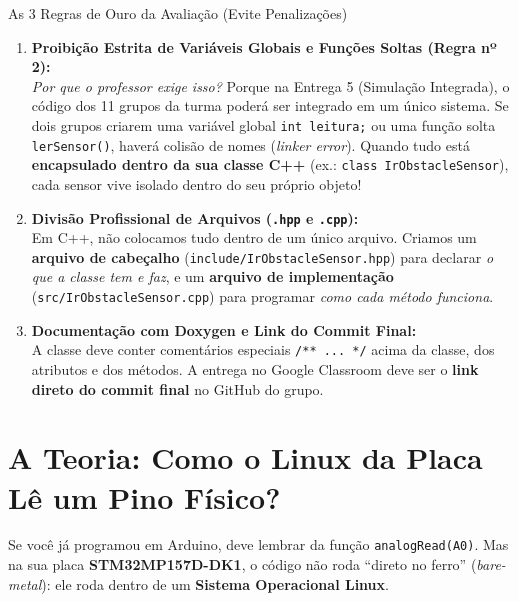 \documentclass[11pt,a4paper]{article}
\begin{document}
\begin{alertbox}{As 3 Regras de Ouro da Avaliação (Evite Penalizações)}
\begin{enumerate}[leftmargin=*]
    \item \textbf{Proibição Estrita de Variáveis Globais e Funções Soltas (Regra nº 2):} \\
    \textit{Por que o professor exige isso?} Porque na Entrega 5 (Simulação Integrada), o código dos 11 grupos da turma poderá ser integrado em um único sistema. Se dois grupos criarem uma variável global \texttt{int leitura;} ou uma função solta \texttt{lerSensor()}, haverá colisão de nomes (\textit{linker error}). Quando tudo está \textbf{encapsulado dentro da sua classe C++} (ex.: \texttt{class IrObstacleSensor}), cada sensor vive isolado dentro do seu próprio objeto!
    
    \item \textbf{Divisão Profissional de Arquivos (\texttt{.hpp} e \texttt{.cpp}):} \\
    Em C++, não colocamos tudo dentro de um único arquivo. Criamos um \textbf{arquivo de cabeçalho} (\texttt{include/IrObstacleSensor.hpp}) para declarar \textit{o que a classe tem e faz}, e um \textbf{arquivo de implementação} (\texttt{src/IrObstacleSensor.cpp}) para programar \textit{como cada método funciona}.
    
    \item \textbf{Documentação com Doxygen e Link do Commit Final:} \\
    A classe deve conter comentários especiais \texttt{/** ... */} acima da classe, dos atributos e dos métodos. A entrega no Google Classroom deve ser o \textbf{link direto do commit final} no GitHub do grupo.
\end{enumerate}
\end{alertbox}

\section{A Teoria: Como o Linux da Placa Lê um Pino Físico?}

Se você já programou em Arduino, deve lembrar da função \texttt{analogRead(A0)}. Mas na sua placa \textbf{STM32MP157D-DK1}, o código não roda ``direto no ferro'' (\textit{bare-metal}): ele roda dentro de um \textbf{Sistema Operacional Linux}.
\end{document}
